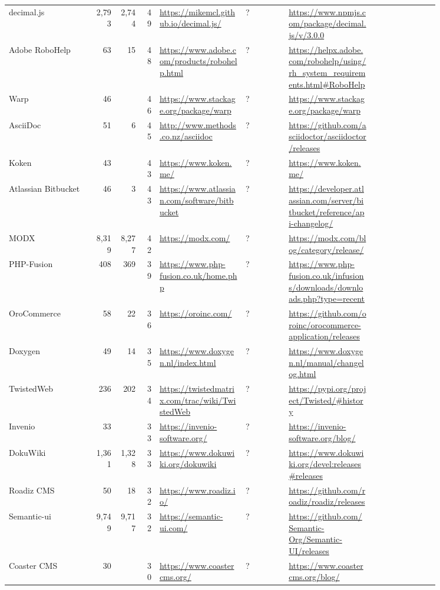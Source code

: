 \begin{longtable}{|p{0.2\linewidth}|r|r|r|p{0.2\linewidth}|p{0.1\linewidth}|p{0.2\linewidth}|p{0.15\linewidth}|}
	decimal.js &2,793 &2,744 &49 &\url{https://mikemcl.github.io/decimal.js/} &? &\url{https://www.npmjs.com/package/decimal.js/v/3.0.0} \\
	Adobe RoboHelp &63 &15 &48 &\url{https://www.adobe.com/products/robohelp.html} &? &\url{https://helpx.adobe.com/robohelp/using/rh\_system\_requirements.html\#RoboHelp} \\
	Warp &46 & &46 &\url{https://www.stackage.org/package/warp} &? &\url{https://www.stackage.org/package/warp} \\
	AsciiDoc &51 &6 &45 &\url{http://www.methods.co.nz/asciidoc} &? &\url{https://github.com/asciidoctor/asciidoctor/releases} \\
	Koken &43 & &43 &\url{https://www.koken.me/} &? &\url{https://www.koken.me/} \\
	Atlassian Bitbucket &46 &3 &43 &\url{https://www.atlassian.com/software/bitbucket} &? &\url{https://developer.atlassian.com/server/bitbucket/reference/api-changelog/} \\
	MODX &8,319 &8,277 &42 &\url{https://modx.com/} &? &\url{https://modx.com/blog/category/release/} \\
	PHP-Fusion &408 &369 &39 &\url{https://www.php-fusion.co.uk/home.php} &? &\url{https://www.php-fusion.co.uk/infusions/downloads/downloads.php?type=recent} \\
	OroCommerce &58 &22 &36 &\url{https://oroinc.com/} &? &\url{https://github.com/oroinc/orocommerce-application/releases} \\
	Doxygen &49 &14 &35 &\url{https://www.doxygen.nl/index.html} &? &\url{https://www.doxygen.nl/manual/changelog.html} \\
	TwistedWeb &236 &202 &34 &\url{https://twistedmatrix.com/trac/wiki/TwistedWeb} &? &\url{https://pypi.org/project/Twisted/\#history} \\
	Invenio &33 & &33 &\url{https://invenio-software.org/} &? &\url{https://invenio-software.org/blog/} \\
	DokuWiki &1,361 &1,328 &33 &\url{https://www.dokuwiki.org/dokuwiki} &? &\url{https://www.dokuwiki.org/devel:releases\#releases} \\
	Roadiz CMS &50 &18 &32 &\url{https://www.roadiz.io/} &? &\url{https://github.com/roadiz/roadiz/releases} \\
	Semantic-ui &9,749 &9,717 &32 &\url{https://semantic-ui.com/} &? &\url{https://github.com/Semantic-Org/Semantic-UI/releases} \\
	Coaster CMS &30 & &30 &\url{https://www.coastercms.org/} &? &\url{https://www.coastercms.org/blog/} \\

\end{longtable}
